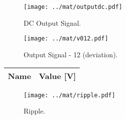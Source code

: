 \begin{figure}[H] \centering
\texttt{[image: ../mat/outputdc.pdf]}
\caption{DC Output Signal.}
\label{fig:outputdc}
\end{figure}

\begin{figure}[H] \centering
\texttt{[image: ../mat/v012.pdf]}
\caption{Output Signal - 12 (deviation).}
\label{fig:v012}
\end{figure}

\begin{table}[H]
  \centering
  \begin{tabular}{|l|r|}
    \hline    
    {\bf Name} & {\bf Value [V]} \\ \hline
    
  \end{tabular}
  \label{tab:ripple}
\end{table}

\begin{figure}[H] \centering
\texttt{[image: ../mat/ripple.pdf]}
\caption{Ripple.}
\label{fig:ripplegraph}
\end{figure}